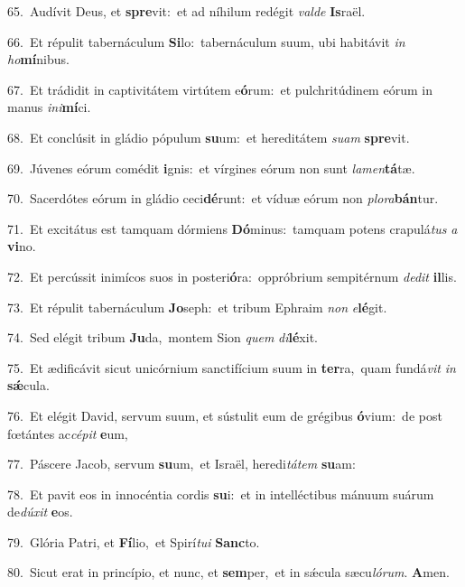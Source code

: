 {\numbfont\textcolor{\numbcolor}{65.}}~Audívit Deus, et \textbf{spre}\-vit:~\star et ad níhilum redégit \textit{val}\-\textit{de} \textbf{Is}\-raël.\par
{\numbfont\textcolor{\numbcolor}{66.}}~Et répulit tabernáculum \textbf{Si}\-lo:~\star tabernáculum suum, ubi habitávit \textit{in} \textit{ho}\-\textbf{mí}nibus.\par
{\numbfont\textcolor{\numbcolor}{67.}}~Et trádidit in captivitátem virtútem e\-\textbf{ó}\-rum:~\star et pulchritúdinem eórum in manus \textit{in}\-\textit{i}\textbf{mí}ci.\par
{\numbfont\textcolor{\numbcolor}{68.}}~Et conclúsit in gládio pópulum \textbf{su}\-um:~\star et hereditátem \textit{su}\-\textit{am} \textbf{spre}\-vit.\par
{\numbfont\textcolor{\numbcolor}{69.}}~Júvenes eórum comédit \textbf{i}\-gnis:~\star et vírgines eórum non sunt \textit{la}\-\textit{men}\textbf{tá}tæ.\par
{\numbfont\textcolor{\numbcolor}{70.}}~Sacerdótes eórum in gládio ceci\-\textbf{dé}\-runt:~\star et víduæ eórum non \textit{plo}\-\textit{ra}\textbf{bán}tur.\par
{\numbfont\textcolor{\numbcolor}{71.}}~Et excitátus est tamquam dórmiens \textbf{Dó}\-minus:~\star tamquam potens crapulá\textit{tus} \textit{a} \textbf{vi}\-no.\par
{\numbfont\textcolor{\numbcolor}{72.}}~Et percússit inimícos suos in posteri\-\textbf{ó}\-ra:~\star oppróbrium sempitérnum \textit{de}\-\textit{dit} \textbf{il}\-lis.\par
{\numbfont\textcolor{\numbcolor}{73.}}~Et répulit tabernáculum \textbf{Jo}\-seph:~\star et tribum Ephraim \textit{non} \textit{e}\-\textbf{lé}git.\par
{\numbfont\textcolor{\numbcolor}{74.}}~Sed elégit tribum \textbf{Ju}\-da,~\star montem Sion \textit{quem} \textit{di}\-\textbf{lé}xit.\par
{\numbfont\textcolor{\numbcolor}{75.}}~Et ædificávit sicut unicórnium sanctifícium suum in \textbf{ter}\-ra,~\star quam fundá\textit{vit} \textit{in} \textbf{sǽ}\-cula.\par
{\numbfont\textcolor{\numbcolor}{76.}}~Et elégit David, servum suum, et sústulit eum de grégibus \textbf{ó}\-vium:~\star de post fœtántes ac\-\textit{cé}\-\textit{pit} \textbf{e}\-um,\par
{\numbfont\textcolor{\numbcolor}{77.}}~Páscere Jacob, servum \textbf{su}\-um,~\star et Israël, heredi\-\textit{tá}\-\textit{tem} \textbf{su}\-am:\par
{\numbfont\textcolor{\numbcolor}{78.}}~Et pavit eos in innocéntia cordis \textbf{su}\-i:~\star et in intelléctibus mánuum suárum de\-\textit{dú}\-\textit{xit} \textbf{e}\-os.\par
{\numbfont\textcolor{\numbcolor}{79.}}~Glória Patri, et \textbf{Fí}\-lio,~\star et Spirí\-\textit{tu}\-\textit{i} \textbf{Sanc}\-to.\par
{\numbfont\textcolor{\numbcolor}{80.}}~Sicut erat in princípio, et nunc, et \textbf{sem}\-per,~\star et in sǽcula sæcu\-\textit{ló}\-\textit{rum}. \textbf{A}\-men.\par
